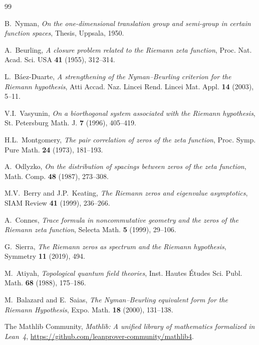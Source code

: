 \documentclass[11pt,a4paper]{article}
\theoremstyle{definition}
\begin{document}
\begin{thebibliography}{99}

B.~Nyman, \emph{On the one-dimensional translation group and semi-group in
certain function spaces}, Thesis, Uppsala, 1950.

A.~Beurling, \emph{A closure problem related to the Riemann zeta function},
Proc. Nat. Acad. Sci. USA \textbf{41} (1955), 312--314.

L.~B\'aez-Duarte, \emph{A strengthening of the Nyman--Beurling criterion for
the Riemann hypothesis}, Atti Accad. Naz. Lincei Rend. Lincei Mat. Appl.
\textbf{14} (2003), 5--11.

V.I.~Vasyunin, \emph{On a biorthogonal system associated with the Riemann
hypothesis}, St. Petersburg Math. J. \textbf{7} (1996), 405--419.

H.L.~Montgomery, \emph{The pair correlation of zeros of the zeta function},
Proc. Symp. Pure Math. \textbf{24} (1973), 181--193.

A.~Odlyzko, \emph{On the distribution of spacings between zeros of the zeta
function}, Math. Comp. \textbf{48} (1987), 273--308.

M.V.~Berry and J.P.~Keating, \emph{The Riemann zeros and eigenvalue
asymptotics}, SIAM Review \textbf{41} (1999), 236--266.

A.~Connes, \emph{Trace formula in noncommutative geometry and the zeros of
the Riemann zeta function}, Selecta Math. \textbf{5} (1999), 29--106.

G.~Sierra, \emph{The Riemann zeros as spectrum and the Riemann hypothesis},
Symmetry \textbf{11} (2019), 494.

M.~Atiyah, \emph{Topological quantum field theories}, Inst. Hautes \'Etudes
Sci. Publ. Math. \textbf{68} (1988), 175--186.

M.~Balazard and E.~Saias, \emph{The Nyman--Beurling equivalent form for the
Riemann Hypothesis}, Expo. Math. \textbf{18} (2000), 131--138.

The Mathlib Community, \emph{Mathlib: A unified library of mathematics
formalized in Lean~4}, \url{https://github.com/leanprover-community/mathlib4}.

\end{thebibliography}
\end{document}
